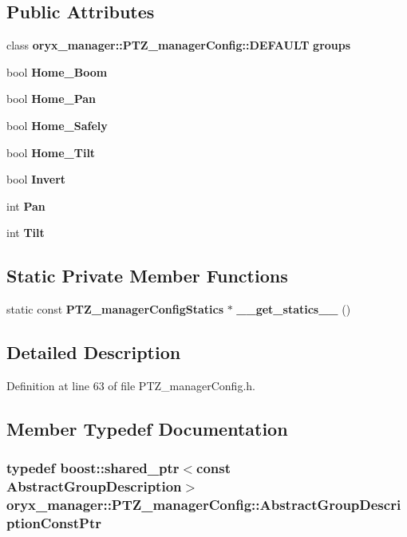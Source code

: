 \subsection*{\-Public \-Attributes}
\begin{DoxyCompactItemize}
\item 
class \*
{\bf oryx\-\_\-manager\-::\-P\-T\-Z\-\_\-manager\-Config\-::\-D\-E\-F\-A\-U\-L\-T} {\bf groups}
\item 
bool {\bf \-Home\-\_\-\-Boom}
\item 
bool {\bf \-Home\-\_\-\-Pan}
\item 
bool {\bf \-Home\-\_\-\-Safely}
\item 
bool {\bf \-Home\-\_\-\-Tilt}
\item 
bool {\bf \-Invert}
\item 
int {\bf \-Pan}
\item 
int {\bf \-Tilt}
\end{DoxyCompactItemize}
\subsection*{\-Static \-Private \-Member \-Functions}
\begin{DoxyCompactItemize}
\item 
static const \*
{\bf \-P\-T\-Z\-\_\-manager\-Config\-Statics} $\ast$ {\bf \-\_\-\-\_\-get\-\_\-statics\-\_\-\-\_\-} ()
\end{DoxyCompactItemize}


\subsection{\-Detailed \-Description}


\-Definition at line 63 of file \-P\-T\-Z\-\_\-manager\-Config.\-h.



\subsection{\-Member \-Typedef \-Documentation}
\subsubsection[{\-Abstract\-Group\-Description\-Const\-Ptr}]{\setlength{\rightskip}{0pt plus 5cm}typedef boost\-::shared\-\_\-ptr$<$const {\bf \-Abstract\-Group\-Description}$>$ {\bf oryx\-\_\-manager\-::\-P\-T\-Z\-\_\-manager\-Config\-::\-Abstract\-Group\-Description\-Const\-Ptr}}\label{classoryx__manager_1_1PTZ__managerConfig_a796a24f7da0cbb3095b5796d9a0cb1bc}


